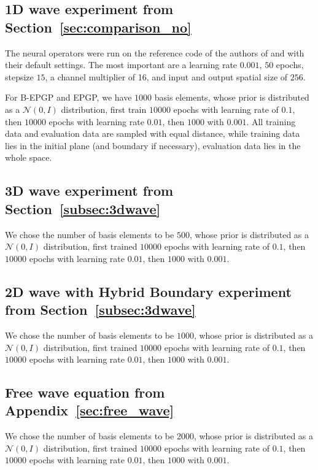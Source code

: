 \documentclass{article} %
\theoremstyle{plain}
\theoremstyle{definition}
\theoremstyle{remark}
\begin{document}
\subsection{1D wave experiment from Section~\ref{sec:comparison_no}}\label{sec:operator_details}

The neural operators were run on the reference code of the authors of \citep{raonic2024convolutional} and \citep{Li2021} with their default settings. The most important are a learning rate $0.001$, $50$ epochs, stepsize $15$, a channel multiplier of 16, and input and output spatial size of $256$.

For B-EPGP and EPGP, we have $1000$ basis elements, whose prior is distributed as a $\mathcal{N}(0,I)$ distribution, first train $10000$ epochs with learning rate of $0.1$, then $10000$ epochs with learning rate $0.01$, then $1000$ with $0.001$. All training data and evaluation data are sampled with equal distance, while training data lies in the initial plane (and boundary if necessary), evaluation data lies in the whole space.  %

\subsection{3D wave experiment from Section~\ref{subsec:3dwave}}\label{sec:3d_operator_details}
We chose the number of basis elements to be \(500\), whose prior is distributed as a $\mathcal{N}(0,I)$ distribution, first trained $10000$ epochs with learning rate of $0.1$, then $10000$ epochs with learning rate $0.01$, then $1000$ with $0.001$.

\subsection{2D wave with Hybrid Boundary experiment from Section~\ref{subsec:3dwave}}\label{sec:2d_hybrid_details}
We chose the number of basis elements to be \(1000\), whose prior is distributed as a $\mathcal{N}(0,I)$ distribution, first trained $10000$ epochs with learning rate of $0.1$, then $10000$ epochs with learning rate $0.01$, then $1000$ with $0.001$.

\subsection{Free wave equation from Appendix~\ref{sec:free_wave}}\label{sec:free_wave_details}
We chose the number of basis elements to be \(2000\), whose prior is distributed as a $\mathcal{N}(0,I)$ distribution, first trained $10000$ epochs with learning rate of $0.1$, then $10000$ epochs with learning rate $0.01$, then $1000$ with $0.001$.
\end{document}
